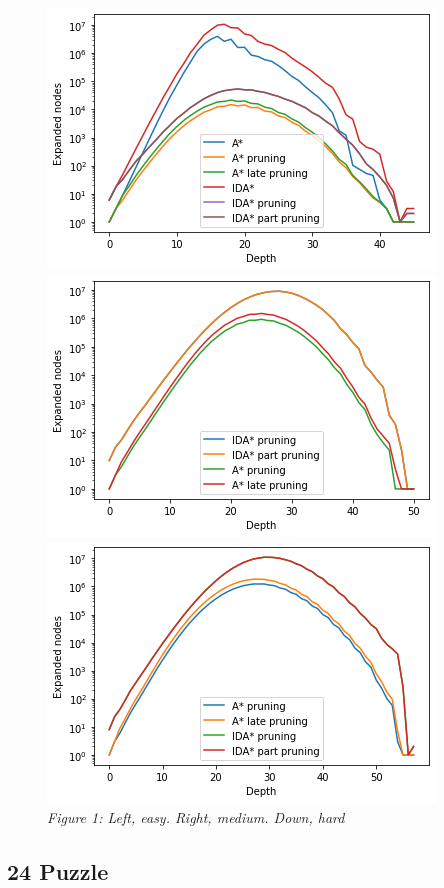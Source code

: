 \documentclass[a4paper,10pt]{article}
\begin{document}
    \begin{figure}[h!]
      \centering
      \includegraphics[scale=0.6]{15puzzle_easy.png}
      \includegraphics[scale=0.6]{15puzzle_medium.png}
      \includegraphics[scale=0.6]{15puzzle_hard.png}
      \\
      \small{\textit{Figure 1: Left, easy. Right, medium. Down, hard}}
    \end{figure}
    
  \subsection{24 Puzzle}
\end{document}
